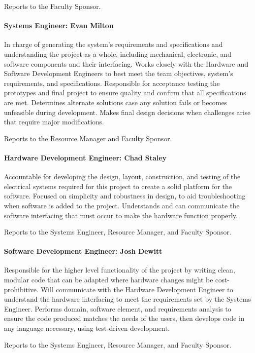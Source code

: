 \documentclass[11pt]{report}
\begin{document}
Reports to the Faculty Sponsor. 

\paragraph{Systems Engineer: Evan Milton}
In charge of generating the system's requirements and specifications and understanding the project as a whole, including mechanical, electronic, and software components and their interfacing.
Works closely with the Hardware and Software Development Engineers to best meet the team objectives, system's requirements, and specifications.
Responsible for acceptance testing the prototypes and final project to ensure quality and confirm that all specifications are met.
Determines alternate solutions case any solution fails or becomes unfeasible during development.
Makes final design decisions when challenges arise that require major modifications.

Reports to the Resource Manager and Faculty Sponsor.

\paragraph{Hardware Development Engineer: Chad Staley}
Accountable for developing the design, layout, construction, and testing of the electrical systems required for this project to create a solid platform for the software.
Focused on simplicity and robustness in design, to aid troubleshooting when software is added to the project.
Understands and can communicate the software interfacing that must occur to make the hardware function properly.

Reports to the Systems Engineer, Resource Manager, and Faculty Sponsor. 

\paragraph{Software Development Engineer: Josh Dewitt}
Responsible for the higher level functionality of the project by writing clean, modular code that can be adapted where hardware changes might be cost-prohibitive.
Will communicate with the Hardware Development Engineer to understand the hardware interfacing to meet the requirements set by the Systems Engineer.
Performs domain, software element, and requirements analysis to ensure the code produced matches the needs of the users, then develops code in any language necessary, using test­-driven development.

Reports to the Systems Engineer, Resource Manager, and Faculty Sponsor.
\end{document}
